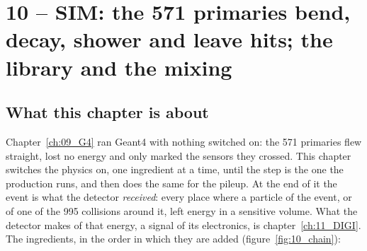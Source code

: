
\chapter{10 -- SIM: the 571 primaries bend, decay, shower and leave hits; the library and the mixing}
\label{ch:10_SIM}

\section{What this chapter is about}

Chapter~\ref{ch:09_G4} ran Geant4 with nothing switched on: the 571 primaries flew straight, lost no energy and
only marked the sensors they crossed. This chapter switches the physics on, one ingredient at a time, until the
 step is the one the production runs, and then does the same for the pileup. At the end of it the event
is what the detector \emph{received}: every place where a particle of the event, or of one of the 995 collisions
around it, left energy in a sensitive volume. What the detector makes of that energy, a signal of its electronics,
is chapter~\ref{ch:11_DIGI}. The ingredients, in the order in which they are added (figure~\ref{fig:10_chain}):

